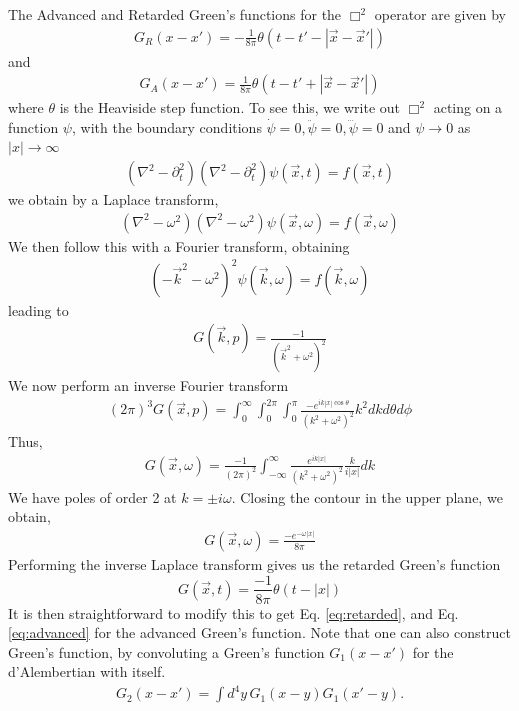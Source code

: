 \documentclass[aps,preprintnumbers,superscriptaddress,longbibliography]{revtex4-1}
\begin{document}
The Advanced and Retarded Green's functions for the $\Box^2$ operator are given by 
\begin{align}
    G_R(x-x')=-\frac{1}{8\pi}\theta(t-t'-|\vec{x}-\vec{x}'|)
    \label{eq:retarded}
\end{align}and
\begin{align}
    G_A(x-x')=\frac{1}{8\pi}\theta(t-t'+|\vec{x}-\vec{x}'|)
    \label{eq:advanced}
\end{align}
where $\theta$ is the Heaviside step function.
To see this, we write out $\Box^2$ acting on a function $\psi$, with the boundary conditions $\dot{\psi}=0,\ddot{\psi}=0,\dddot{\psi}=0$ and $\psi\rightarrow 0$ as $|x| \rightarrow \infty$
\begin{align}
    (\nabla^2-\partial_t^2)(\nabla^2-\partial_t^2)\psi(\vec{x},t)=f(\vec{x},t)
\end{align}
we obtain by a Laplace transform,
\begin{align}
    (\nabla^2-\omega^2)(\nabla^2-\omega^2)\psi(\vec{x},\omega)=f(\vec{x},\omega)
\end{align}
We then follow this with a Fourier transform, obtaining
\begin{align}
    (-\vec{k}^2-\omega^2)^2\psi(\vec{k},\omega)=f(\vec{k},\omega)
\end{align}
leading to
\begin{align}
   G(\vec{k},p)= \frac{-1}{(\vec{k}^2+\omega^2)^2}
\end{align}
We now perform an inverse Fourier transform
\begin{align}
 (2\pi)^3 G(\vec{x},p)=\int_{0}^\infty \int_{0}^{2\pi} \int_{0}^{\pi}\frac{-e^{ik|x|\cos\theta}}{(k^2+\omega^2)^2}k^2dk d\theta d\phi
\end{align}
Thus,
\begin{align}
    G(\vec{x},\omega)=\frac{-1}{(2\pi)^2}\int_{-\infty}^{\infty}\frac{e^{ik|x|}}{(k^2+\omega^2)^2}\frac{k}{i|x|}dk
\end{align}
We have poles of order 2 at $k=\pm i\omega$. Closing the contour in the upper plane, we obtain, 
\begin{align}
    G(\vec{x},\omega)=\frac{-e^{-\omega|x|}}{8\pi}
\end{align}
Performing the inverse Laplace transform gives us the retarded Green's function
\begin{equation}
    \label{eq:Inverse of box2}
    G(\vec{x},t)=\frac{-1}{8\pi}\theta(t-|x|)
\end{equation}
It is then straightforward to modify this to get 
Eq. \eqref{eq:retarded}, and Eq. \eqref{eq:advanced} for the advanced Green's function. Note that one can also construct Green's function, by convoluting a Green's function $G_1(x-x')$ for the d'Alembertian with itself. 
\begin{align}
    G_{2}(x-x')=\int d^4y\, G_1(x-y)G_1(x'-y).
    \label{eq:BoxsquaredGF} 
\end{align}
\end{document}
